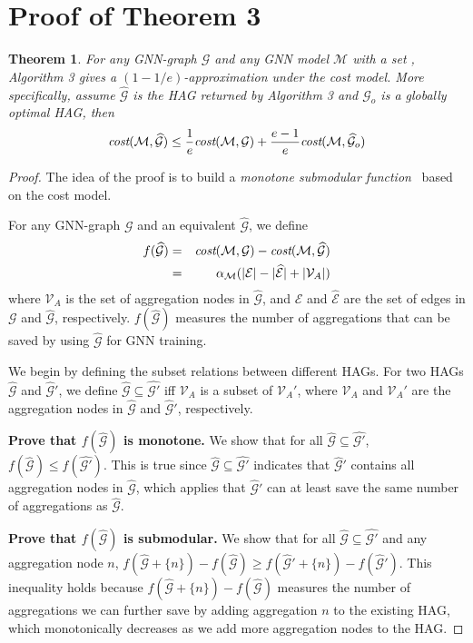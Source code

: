 \documentclass{article}
\newcommand{\er}[1]{\mbox{\rm\em #1}}
\newcommand{\xg}{HAG\xspace}
\newcommand{\xgs}{HAGs\xspace}
\newcommand{\mw}[1] {\mathcal{\widehat{#1}}}
\newcommand{\m}[1] {\mathcal{#1}}
\newtheorem{theorem}{Theorem}
\begin{document}
\section{Proof of Theorem 3}
\begin{theorem}
\label{thm4}
For any GNN-graph $\m{G}$ and any GNN model $\m{M}$ with a set , Algorithm 3 gives a $(1-1/e)$-approximation under the cost model. More specifically, assume $\mw{G}$ is the \xg returned by Algorithm 3 and $\mw{G}_o$ is a globally optimal \xg, then
$$
\er{cost}(\m{M}, \mw{G}) \leq \frac{1}{e} \er{cost}(\m{M}, \m{G}) + \frac{e-1}{e} \er{cost}(\m{M}, \mw{G}_o)
$$
\end{theorem}

\begin{proof}
The idea of the proof is to build a {\em monotone submodular function}~\cite{IntroAlg} based on the cost model. 

For any GNN-graph $\m{G}$ and an equivalent $\mw{G}$, we define
\begin{eqnarray}
\label{eqn0}
f(\mw{G}) & = & \er{cost}(\m{M}, \m{G}) - \er{cost}(\m{M}, \mw{G})  \\
& = & \alpha_{\m{M}} (|\m{E}| - |\mw{E}| + |\m{V}_A|) 
\end{eqnarray}
where $\m{V}_A$ is the set of aggregation nodes in $\mw{G}$, and $\m{E}$ and $\mw{E}$ are the set of edges in $\m{G}$ and $\mw{G}$, respectively.
$f(\mw{G})$ measures the number of aggregations that can be saved by using $\mw{G}$ for GNN training.

We begin by defining the subset relations between different \xgs. For two \xgs $\mw{G}$ and $\mw{G}'$, we define $\mw{G} \subseteq \mw{G'}$ iff $\m{V}_A$ is a subset of $\m{V}_A'$, where $\m{V}_A$ and $\m{V}_A'$ are the aggregation nodes in $\mw{G}$ and $\mw{G}'$, respectively.

{\bf Prove that $f(\mw{G})$ is monotone.} We show that for all $\mw{G} \subseteq \mw{G'}$, $f(\mw{G}) \leq f(\mw{G'})$. This is true since $\mw{G} \subseteq \mw{G'}$ indicates that $\mw{G}'$ contains all aggregation nodes in $\mw{G}$, which applies that $\mw{G}'$ can at least save the same number of aggregations as $\mw{G}$.

{\bf Prove that $f(\mw{G})$ is submodular.} We show that for all $\mw{G} \subseteq \mw{G'}$ and any aggregation node $n$, $f(\mw{G} + \{n\}) - f(\mw{G}) \geq f(\mw{G}' + \{n\}) - f(\mw{G}')$.
This inequality holds because $f(\mw{G} + \{n\}) - f(\mw{G})$ measures the number of aggregations we can further save by adding aggregation $n$ to the existing \xg, which monotonically decreases as we add more aggregation nodes to the \xg.


\end{proof}
\end{document}
